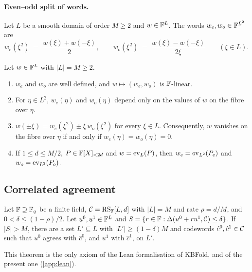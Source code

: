 \paragraph{Even--odd split of words.}
Let $L$ be a smooth domain of order $M \ge 2$ and $w \in \mathbb{F}^L$. The words $w_e, w_o \in \mathbb{F}^{L^2}$ are
\begin{equation}\label{eq:even-odd}
  w_e(\xi^2) \;=\; \frac{w(\xi) + w(-\xi)}{2},
  \qquad
  w_o(\xi^2) \;=\; \frac{w(\xi) - w(-\xi)}{2\xi}
  \qquad (\xi \in L).
\end{equation}

\begin{lemma}\label{lem:split-words}
Let $w \in \mathbb{F}^L$ with $|L| = M \ge 2$.
\begin{enumerate}
  \item $w_e$ and $w_o$ are well defined, and $w \mapsto (w_e,w_o)$ is $\mathbb{F}$-linear.
  \item For $\eta \in L^2$, $w_e(\eta)$ and $w_o(\eta)$ depend only on the values of $w$ on the fibre over $\eta$.
  \item $w(\pm\xi) = w_e(\xi^2) \pm \xi\, w_o(\xi^2)$ for every $\xi \in L$. Consequently, $w$ vanishes on the fibre over $\eta$ if and only if $w_e(\eta) = w_o(\eta) = 0$.
  \item If $1 \le d \le M/2$, $P \in \mathbb{F}[X]_{<2d}$ and $w = \mathrm{ev}_L(P)$, then $w_e = \mathrm{ev}_{L^2}(P_e)$ and $w_o = \mathrm{ev}_{L^2}(P_o)$.
\end{enumerate}
\end{lemma}

\subsection{Correlated agreement}\label{sec:prelim:gaps}

\begin{theorem}\label{thm:bciks}
Let $\mathbb{F} \supseteq \mathbb{F}_q$ be a finite field, $\mathcal{C} = \mathrm{RS}_{\mathbb{F}}[L,d]$ with $|L| = M$ and rate $\rho = d/M$, and $0 < \delta \le (1-\rho)/2$.
Let $u^0, u^1 \in \mathbb{F}^L$ and $S = \{r \in \mathbb{F} : \Delta(u^0 + r u^1, \mathcal{C}) \le \delta\}$.
If $|S| > M$, there are a set $L' \subseteq L$ with $|L'| \ge (1-\delta)M$ and codewords $\hat c^0, \hat c^1 \in \mathcal{C}$ such that $u^0$ agrees with $\hat c^0$, and $u^1$ with $\hat c^1$, on $L'$.
\end{theorem}

This theorem is the only axiom of the Lean formalisation of KBFold, and of the present one (\cref{app:lean}).
